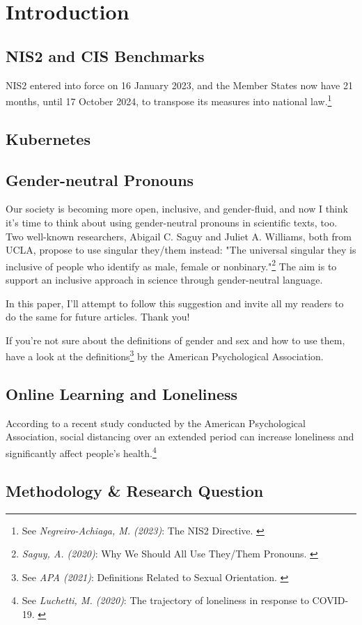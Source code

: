 %
%

\pagebreak
\section{Introduction}

\onehalfspacing

\subsection{NIS2 and CIS Benchmarks}

NIS2 entered into force on 16 January 2023, and the Member States now have 21 months, until 17 October 2024, to transpose its measures into national law.\footnote{See \textit{Negreiro-Achiaga, M. (2023)}: The NIS2 Directive. \cite{nisBrief}}

\subsection{Kubernetes}

\subsection{Gender-neutral Pronouns}

Our society is becoming more open, inclusive, and gender-fluid, and now I think it's time to think about using gender-neutral pronouns in scientific texts, too. Two well-known researchers, Abigail C. Saguy and Juliet A. Williams, both from UCLA, propose to use singular they/them instead: "The universal singular they is inclusive of people who identify as male, female or nonbinary."\footnote{\textit{Saguy, A. (2020)}: Why We Should All Use They/Them Pronouns. \cite{pronouns}} The aim is to support an inclusive approach in science through gender-neutral language. 

In this paper, I'll attempt to follow this suggestion and invite all my readers to do the same for future articles. Thank you!

If you're not sure about the definitions of gender and sex and how to use them, have a look at the definitions\footnote{See \textit{APA (2021)}: Definitions Related to Sexual Orientation. \cite{apaDefinitions}} by the American Psychological Association.

\subsection{Online Learning and Loneliness}

According to a recent study conducted by the American Psychological Association, social distancing over an extended period can increase loneliness and significantly affect people's health.\footnote{See \textit{Luchetti, M. (2020)}: The trajectory of loneliness in response to COVID-19. \cite{apaLoneliness}}

\subsection{Methodology \& Research Question}
